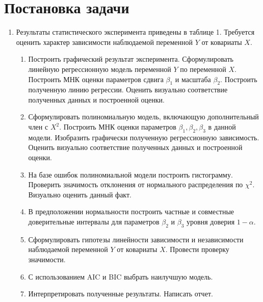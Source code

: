 \documentclass[areasetadvanced]{scrartcl}
\begin{document}
\section{Постановка задачи}
\begin{enumerate}
    \item Результаты статистического эксперимента приведены в таблице 1. Требуется оценить характер зависимости наблюдаемой переменной $Y$ от ковариаты $X$.
    \begin{enumerate}
        \item Построить графический результат эксперимента. Сформулировать линейную регрессионную модель переменной $Y$ по переменной $X$. Построить МНК оценки параметров сдвига $\beta_1$ и масштаба $\beta_2$. Построить полученную линию регрессии. Оценить визуально соответствие полученных данных и построенной оценки.
        \item Сформулировать полиномиальную модель, включающую дополнительный член с $X^2$. Построить МНК оценки параметров $\beta_1, \beta_2, \beta_3$ в данной модели. Изобразить графически полученную регрессионную зависимость. Оценить визуально соответствие полученных данных и построенной оценки.
        \item На базе ошибок полиномиальной модели построить гистограмму. Проверить значимость отклонения от нормального распределения по $\chi^2$. Визуально оценить данный факт.
        \item В предположении нормальности построить частные и совместные доверительные интервалы для параметров $\beta_2$ и $\beta_3$ уровня доверия $1-\alpha$.
        \item Сформулировать гипотезы линейности зависимости и независимости наблюдаемой переменной $Y$ от ковариаты $X$. Провести проверку значимости.
        \item С использованием AIC и BIC выбрать наилучшую модель.
        \item Интерпретировать полученные результаты. Написать отчет.
    \end{enumerate}
    

\end{enumerate}
\end{document}
